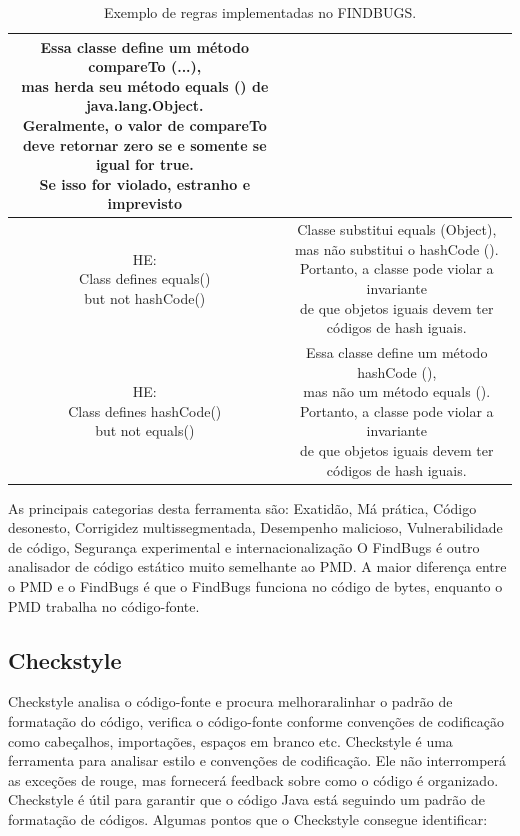 \documentclass[12pt]{article}
\begin{document}
\begin{table}[h!]
\begin{tabular}{| c | c |}
  \makecell{Essa classe define um método compareTo (...),\\ mas herda seu método equals () de java.lang.Object.\\ Geralmente, o valor de compareTo\\ deve retornar zero se e somente se igual for true.\\ Se isso for violado, estranho e imprevisto} \\ 
  \hline \makecell{HE:\\ Class defines equals()\\ but not hashCode() } &
  \makecell{Classe substitui equals (Object),\\ mas não substitui o hashCode ().\\ Portanto, a classe pode violar a invariante\\ de que objetos iguais devem ter códigos de hash iguais.} \\ 
  \hline \makecell{HE:\\ Class defines hashCode()\\ but not equals() } &
  \makecell{Essa classe define um método hashCode (),\\ mas não um método equals ().\\ Portanto, a classe pode violar a invariante\\ de que objetos iguais devem ter\\ códigos de hash iguais.} \\ 
  [1ex] 
  \hline
 \end{tabular}
 \caption{Exemplo de regras implementadas no FINDBUGS\cite{FINDBUGS}.}
 \label{table:FINDBUGS:rules}
\end{table}
 As principais categorias desta ferramenta são: Exatidão, Má prática, Código desonesto, Corrigidez multissegmentada, Desempenho malicioso, Vulnerabilidade de código, Segurança experimental e internacionalização
		O FindBugs é outro analisador de código estático muito semelhante ao PMD. A maior diferença entre o PMD e o FindBugs é que o FindBugs funciona no código de bytes, enquanto o PMD trabalha no código-fonte.


\subsection{Checkstyle} \label{sec:checkstyle}
Checkstyle analisa o código-fonte e procura melhoraralinhar o padrão de formatação do código, verifica o código-fonte conforme convenções de codificação como cabeçalhos, importações, espaços em branco etc.
		Checkstyle é uma ferramenta para analisar estilo e convenções de codificação. Ele não interromperá as exceções de rouge, mas fornecerá feedback sobre como o código é organizado. Checkstyle é útil para garantir que o código Java está seguindo um padrão de formatação de códigos.
		Algumas pontos que o Checkstyle consegue identificar:
\end{document}
